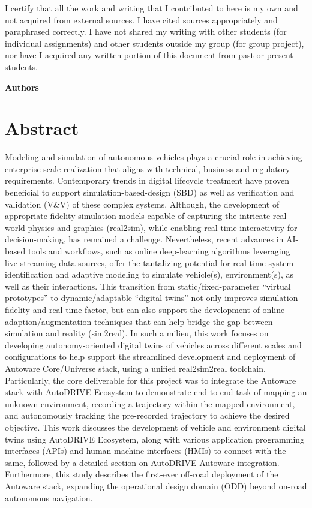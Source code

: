 \begin{titlepage}
    I certify that all the work and writing that I contributed to here is my own and not acquired from external sources. I have cited sources appropriately and paraphrased correctly. I have not shared my writing with other students (for individual assignments) and other students outside my group (for group project), nor have I acquired any written portion of this document from past or present students.

    \begin{flushright}
    \textbf{Authors}
    \end{flushright}

    \pagebreak

    \section*{Abstract}\label{Abstract}
    \thispagestyle{empty}

    Modeling and simulation of autonomous vehicles plays a crucial role in achieving enterprise-scale realization that aligns with technical, business and regulatory requirements. Contemporary trends in digital lifecycle treatment have proven beneficial to support simulation-based-design (SBD) as well as verification and validation (V\&V) of these complex systems. Although, the development of appropriate fidelity simulation models capable of capturing the intricate real-world physics and graphics (real2sim), while enabling real-time interactivity for decision-making, has remained a challenge. Nevertheless, recent advances in AI-based tools and workflows, such as online deep-learning algorithms leveraging live-streaming data sources, offer the tantalizing potential for real-time system-identification and adaptive modeling to simulate vehicle(s), environment(s), as well as their interactions. This transition from static/fixed-parameter “virtual prototypes” to dynamic/adaptable “digital twins” not only improves simulation fidelity and real-time factor, but can also support the development of online adaption/augmentation techniques that can help bridge the gap between simulation and reality (sim2real). In such a milieu, this work focuses on developing autonomy-oriented digital twins of vehicles across different scales and configurations to help support the streamlined development and deployment of Autoware Core/Universe stack, using a unified real2sim2real toolchain. Particularly, the core deliverable for this project was to integrate the Autoware stack with AutoDRIVE Ecosystem to demonstrate end-to-end task of mapping an unknown environment, recording a trajectory within the mapped environment, and autonomously tracking the pre-recorded trajectory to achieve the desired objective. This work discusses the development of vehicle and environment digital twins using AutoDRIVE Ecosystem, along with various application programming interfaces (APIs) and human-machine interfaces (HMIs) to connect with the same, followed by a detailed section on AutoDRIVE-Autoware integration. Furthermore, this study describes the first-ever off-road deployment of the Autoware stack, expanding the operational design domain (ODD) beyond on-road autonomous navigation.\\


\end{titlepage}
